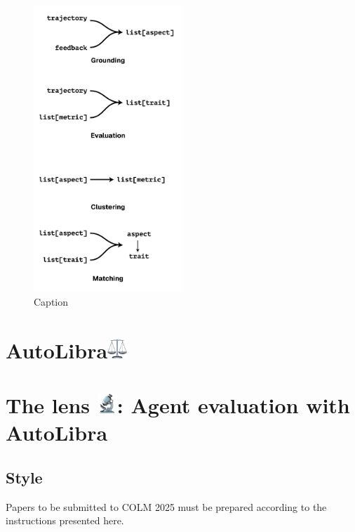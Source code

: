 \documentclass{article} %
\begin{document}
\begin{figure}
    \centering
    \includegraphics[width=0.5\textwidth]{figs/autolibra-pipeline.pdf}
    \caption{Caption}
    \label{fig:enter-label}
\end{figure}

\section{AutoLibra\protect\includegraphics[height=1em]{figs/scale.png}}


\section{The lens \protect\includegraphics[height=1em]{figs/microscope.png}: Agent evaluation with AutoLibra}

\subsection{Style}

Papers to be submitted to COLM 2025 must be prepared according to the
instructions presented here.
\end{document}
